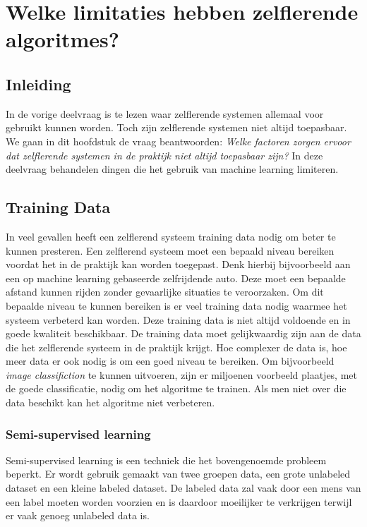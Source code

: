 \section{Welke limitaties hebben zelflerende algoritmes?}

\subsection{Inleiding}
In de vorige deelvraag is te lezen waar zelflerende systemen allemaal voor gebruikt kunnen worden. Toch zijn zelflerende systemen niet altijd toepasbaar. We gaan in dit hoofdstuk de vraag beantwoorden: \textit{Welke factoren zorgen ervoor dat zelflerende systemen in de praktijk niet altijd toepasbaar zijn?} In deze deelvraag behandelen dingen die het gebruik van machine learning limiteren. 

\subsection{Training Data}
In  veel gevallen heeft een zelflerend systeem training data nodig om beter te kunnen presteren. Een zelflerend systeem moet een bepaald niveau bereiken voordat het in de praktijk kan worden toegepast. Denk hierbij bijvoorbeeld aan een op machine learning gebaseerde zelfrijdende auto. Deze moet een bepaalde afstand kunnen rijden zonder gevaarlijke situaties te veroorzaken. Om dit bepaalde niveau te kunnen bereiken is er veel training data nodig waarmee het systeem verbeterd kan worden. Deze training data is niet altijd voldoende en in goede kwaliteit beschikbaar. De training data moet gelijkwaardig zijn aan de data die het zelflerende systeem in de praktijk krijgt. Hoe complexer de data is, hoe meer data er ook nodig is om een goed niveau te bereiken. Om bijvoorbeeld \textit{image classifiction} te kunnen uitvoeren, zijn er miljoenen voorbeeld plaatjes, met de goede classificatie, nodig om het algoritme te trainen. Als men niet over die data beschikt kan het algoritme niet verbeteren. 

\subsubsection{Semi-supervised learning}
Semi-supervised learning is een techniek die het bovengenoemde probleem beperkt. Er wordt gebruik gemaakt van twee groepen data, een grote unlabeled dataset en een kleine labeled dataset. De labeled data zal vaak door een mens van een label moeten worden voorzien en is daardoor moeilijker te verkrijgen terwijl er vaak genoeg unlabeled data is. \cite{SemiSupervisedLearning}

